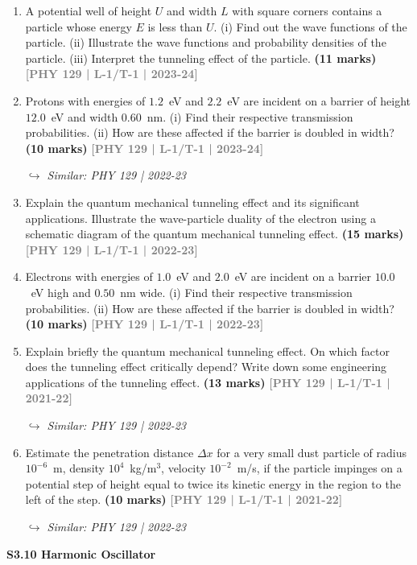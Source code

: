 \documentclass[12pt,a3paper]{article}
\newcommand{\yr}[1]{\hfill\textcolor{gray}{\small\textbf{[#1]}}}
\newcommand{\mk}[1]{\textcolor{orange!70!black}{\small\textbf{(#1 marks)}}}
\newcommand{\variant}[1]{\par\vspace{1pt}\textcolor{blue!50!black}%
  {\footnotesize\textit{$\hookrightarrow$ Similar: #1}}}
\newcommand{\subtopic}[2]{%
  \vspace{10pt}
  \noindent\begin{tcolorbox}[colback=#1!8,colframe=#1,boxrule=0.6pt,arc=4pt,
    left=6pt,right=6pt,top=4pt,bottom=4pt]
    \small\bfseries\textcolor{#1}{#2}
  \end{tcolorbox}
  \vspace{2pt}
}
\begin{document}
\begin{enumerate}

\item A potential well of height $U$ and width $L$ with square corners contains a particle whose energy $E$ is less than $U$. (i) Find out the wave functions of the particle. (ii) Illustrate the wave functions and probability densities of the particle. (iii) Interpret the tunneling effect of the particle.
\mk{11} \yr{PHY 129 | L-1/T-1 | 2023-24}

\item Protons with energies of $1.2$~eV and $2.2$~eV are incident on a barrier of height $12.0$~eV and width $0.60$~nm. (i) Find their respective transmission probabilities. (ii) How are these affected if the barrier is doubled in width?
\mk{10} \yr{PHY 129 | L-1/T-1 | 2023-24}
\variant{PHY 129 | 2022-23}

\item Explain the quantum mechanical tunneling effect and its significant applications. Illustrate the wave-particle duality of the electron using a schematic diagram of the quantum mechanical tunneling effect.
\mk{15} \yr{PHY 129 | L-1/T-1 | 2022-23}

\item Electrons with energies of $1.0$~eV and $2.0$~eV are incident on a barrier $10.0$~eV high and $0.50$~nm wide. (i) Find their respective transmission probabilities. (ii) How are these affected if the barrier is doubled in width?
\mk{10} \yr{PHY 129 | L-1/T-1 | 2022-23}

\item Explain briefly the quantum mechanical tunneling effect. On which factor does the tunneling effect critically depend? Write down some engineering applications of the tunneling effect.
\mk{13} \yr{PHY 129 | L-1/T-1 | 2021-22}
\variant{PHY 129 | 2022-23}

\item Estimate the penetration distance $\Delta x$ for a very small dust particle of radius $10^{-6}$~m, density $10^4$~kg/m$^3$, velocity $10^{-2}$~m/s, if the particle impinges on a potential step of height equal to twice its kinetic energy in the region to the left of the step.
\mk{10} \yr{PHY 129 | L-1/T-1 | 2021-22}
\variant{PHY 129 | 2022-23}

\end{enumerate}

\label{sec:s40}
\subtopic{cA}{S3.10 \quad Harmonic Oscillator}
\end{document}

